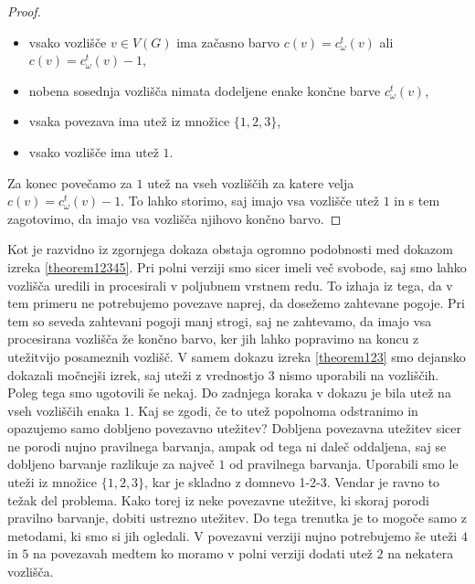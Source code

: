 \documentclass[12pt,a4paper,twoside]{article}
\theoremstyle{definition} %
\theoremstyle{plain} %
\numberwithin{equation}{section}  %
\begin{document}
\begin{proof}
\begin{itemize}
\item vsako vozlišče $v \in V(G)$ ima začasno barvo $c(v) = c_{\omega}^t(v)$ ali $c(v) = c_{\omega}^t(v) - 1$,
\item nobena sosednja vozlišča nimata dodeljene enake končne barve $c_{\omega}^t(v)$,
\item vsaka povezava ima utež iz množice $\{1,2,3\}$,
\item vsako vozlišče ima utež $1$.
\end{itemize}
Za konec povečamo za $1$ utež na vseh vozliščih za katere velja $c(v) = c_{\omega}^t(v) - 1$. To lahko storimo, saj imajo vsa vozlišče utež $1$ in s tem zagotovimo, da imajo vsa vozlišča njihovo končno barvo.

\end{proof}
Kot je razvidno iz zgornjega dokaza obstaja ogromno podobnosti med dokazom izreka \ref{theorem12345}. Pri polni verziji smo sicer imeli več svobode, saj smo lahko vozlišča uredili in procesirali v poljubnem vrstnem redu. To izhaja iz tega, da v tem primeru ne potrebujemo povezave naprej, da dosežemo zahtevane pogoje. Pri tem so seveda zahtevani pogoji manj strogi, saj ne zahtevamo, da imajo vsa procesirana vozlišča že končno barvo, ker jih lahko popravimo na koncu z utežitvijo posameznih vozlišč. V samem dokazu izreka \ref{theorem123} smo dejansko dokazali močnejši izrek, saj uteži z vrednostjo $3$ nismo uporabili na vozliščih. Poleg tega smo ugotovili še nekaj. Do zadnjega koraka v dokazu je bila utež na vseh vozliščih enaka $1$. Kaj se zgodi, če to utež popolnoma odstranimo in opazujemo samo dobljeno povezavno utežitev? Dobljena povezavna utežitev sicer ne porodi nujno pravilnega barvanja, ampak od tega ni daleč oddaljena, saj se dobljeno barvanje razlikuje za največ $1$ od pravilnega barvanja. Uporabili smo le uteži iz množice $\{1,2,3\}$, kar je skladno z domnevo 1-2-3. Vendar je ravno to težak del problema. Kako torej iz neke povezavne utežitve, ki skoraj porodi pravilno barvanje, dobiti ustrezno utežitev. Do tega trenutka je to mogoče samo z metodami, ki smo si jih ogledali. V povezavni verziji nujno potrebujemo še uteži $4$ in $5$ na povezavah medtem ko moramo v polni verziji dodati utež $2$ na nekatera vozlišča.
\end{document}
